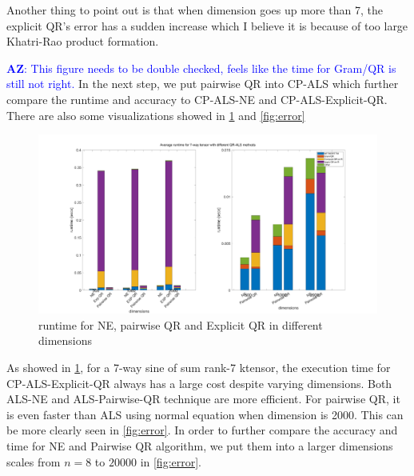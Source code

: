 \documentclass{article}
\newcommand{\AZ}[1]{\textcolor{blue}{\textbf{AZ}: #1}}
\begin{document}
Another thing to point out is that when dimension goes up more than 7, the explicit QR's error has a sudden increase which I believe it is because of too large Khatri-Rao product formation.

\AZ{This figure needs to be double checked, feels like the time for Gram/QR is still not right.}
In the next step, we put pairwise QR into CP-ALS which further compare the runtime and accuracy to CP-ALS-NE and CP-ALS-Explicit-QR. 
There are also some visualizations showed in \cref{fig:runtime} and \cref{fig:error}
\begin{figure}[ht!]
  \begin{center}
    
    \includegraphics[scale = 0.15]{7runtime.jpg}
    \caption[Figure]{runtime for NE, pairwise QR and Explicit QR in different dimensions \label{fig:runtime}}
  \end{center}
\end{figure}




As showed in \cref*{fig:runtime}, for a 7-way sine of sum rank-7 ktensor, the execution time for CP-ALS-Explicit-QR always has a large cost despite varying dimensions. 
Both ALS-NE and ALS-Pairwise-QR technique are more efficient.
For pairwise QR, it is even faster than ALS using normal equation when dimension is 2000. This can be more clearly seen in \cref{fig:error}.
In order to further compare the accuracy and time for NE and Pairwise QR algorithm, we put them into a larger dimensions scales from $n = 8$ to $20000$ in \cref{fig:error}.
\end{document}
